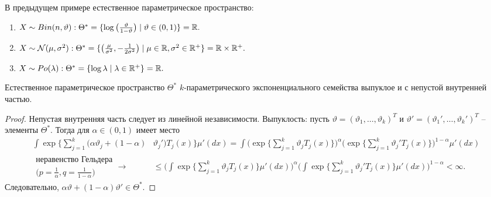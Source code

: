 \begin{exmp}
	В предыдущем примере естественное параметрическое пространство:
	\begin{enumerate}
		\item $X \sim Bin(n, \vartheta): \Theta^* = \{\log\big(\frac{\vartheta}{1-\vartheta}\big) \mid \vartheta \in (0, 1) \} = \mathbb{R}.$
		\item $X \sim \mathcal{N}(\mu, \sigma^2): \Theta^* = \{\big(\frac{\mu}{\sigma^2}, -\frac{1}{2\sigma^2}\big) \mid \mu \in \mathbb{R}, \sigma^2 \in \mathbb{R}^+ \} = \mathbb{R} \times \mathbb{R}^+.$
		\item $X \sim Po(\lambda): \Theta^* = \{\log \lambda \mid \lambda \in \mathbb{R}^+ \} = \mathbb{R}.$
	\end{enumerate}
\end{exmp}

\begin{thm}
	Естественное параметрическое пространство $\Theta^*$ $k$-параметрического экспоненциального семейства выпуклое и с непустой внутренней частью.
\end{thm}
\begin{proof}
	Непустая внутренняя часть следует из линейной независимости. Выпуклость: пусть $\vartheta = (\vartheta_1, \dots, \vartheta_k)^T$ и $\vartheta' = (\vartheta_1', \dots, \vartheta_k')^T$ -- элементы $\Theta^*$. Тогда для $\alpha \in (0, 1)$ имеет место
	\[ \begin{aligned}
	  \int \exp \Big \{ \sum_{j = 1}^{k} (\alpha \vartheta_j + (1-\alpha) & \vartheta_j') T_j(x) \Big\}\mu'(dx) = \int \Big(\exp \Big \{\sum_{j = 1}^{k} \vartheta_j T_j(x) \Big\}\Big)^\alpha \Big(\exp \Big \{\sum_{j = 1}^{k} \vartheta_j' T_j(x) \Big\}\Big)^{1-\alpha} \mu'(dx) \\
	  \begin{aligned}\text{неравенство Гельдера} \\ \Big(p = \frac{1}{\alpha}, q = \frac{1}{1 - \alpha}\Big) \end{aligned}\longrightarrow & \leq  \Bigg(\int \exp \Big \{\sum_{j = 1}^{k} \vartheta_j T_j(x) \Big\}\mu'(dx)\Bigg)^\alpha \Bigg(\int\exp \Big \{\sum_{j = 1}^{k} \vartheta_j' T_j(x) \Big\}\mu'(dx) \Bigg)^{1-\alpha} < \infty.
	\end{aligned} \]
	Следовательно, $\alpha \vartheta + (1-\alpha)\vartheta' \in \Theta^*$.
\end{proof}

